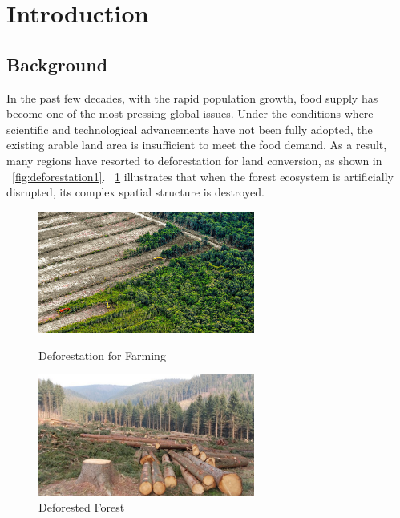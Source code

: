 \documentclass{HZNUMCM}
\begin{document}
\showSummarySheet
\newpage %
\showContents
  \section{Introduction}
    \subsection{Background}
    In the past few decades, with the rapid population growth, 
    food supply has become one of the most pressing global issues. 
    Under the conditions where scientific and technological advancements have not been fully adopted, 
    the existing arable land area is insufficient to meet the food demand. 
    As a result, many regions have resorted to deforestation for land conversion, 
    as shown in \figurename~\ref{fig:deforestation1}. \figurename~\ref{fig:deforestation2} illustrates that when the forest ecosystem is artificially disrupted, 
    its complex spatial structure is destroyed.
    \begin{figure}[H]
      \centering
        \begin{minipage}[b]{0.45\linewidth}
            \centering
            \includegraphics[height=4cm, keepaspectratio]{images/deforestation1.jpg} %
            \caption{Deforestation for Farming}
            \label{fig:deforestation1}
        \end{minipage}
      \hspace{0.05\linewidth}
        \begin{minipage}[b]{0.45\linewidth}
            \centering
            \includegraphics[height=4cm, keepaspectratio]{images/deforestation2.jpg} %
            \caption{Deforested Forest}
            \label{fig:deforestation2}
        \end{minipage}
      \end{figure}
\end{document}
